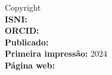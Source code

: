
\newpage
\thispagestyle{empty}

{%
\noindent Copyright \textcopyright\ \BookEditionYear\ \BookAuthor\\ %
\noindent \textbf{ISNI:} \AuthorNumberISNI\\
\noindent \textbf{ORCID:} \AuthorNumberOrcid\\


\noindent \textbf{Publicado:} \BookPublishingEditor\\ %
\noindent \textbf{Primeira impressão:} 2024\\ %
\noindent \textbf{Página web:} \BookHomePage\\ %
\vfill



}
\newpage
